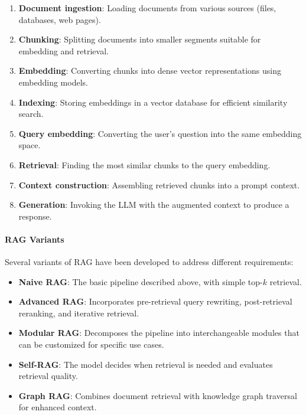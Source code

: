 \documentclass[a4paper,twoside]{sapthesis}
\begin{document}
\begin{enumerate}
    \item \textbf{Document ingestion}: Loading documents from various sources (files, databases, web pages).
    
    \item \textbf{Chunking}: Splitting documents into smaller segments suitable for embedding and retrieval.
    
    \item \textbf{Embedding}: Converting chunks into dense vector representations using embedding models.
    
    \item \textbf{Indexing}: Storing embeddings in a vector database for efficient similarity search.
    
    \item \textbf{Query embedding}: Converting the user's question into the same embedding space.
    
    \item \textbf{Retrieval}: Finding the most similar chunks to the query embedding.
    
    \item \textbf{Context construction}: Assembling retrieved chunks into a prompt context.
    
    \item \textbf{Generation}: Invoking the LLM with the augmented context to produce a response.
\end{enumerate}

\paragraph{RAG Variants}

Several variants of RAG have been developed to address different requirements:

\begin{itemize}
    \item \textbf{Naive RAG}: The basic pipeline described above, with simple top-$k$ retrieval.
    
    \item \textbf{Advanced RAG}: Incorporates pre-retrieval query rewriting, post-retrieval reranking, and iterative retrieval.
    
    \item \textbf{Modular RAG}: Decomposes the pipeline into interchangeable modules that can be customized for specific use cases.
    
    \item \textbf{Self-RAG}: The model decides when retrieval is needed and evaluates retrieval quality.
    
    \item \textbf{Graph RAG}: Combines document retrieval with knowledge graph traversal for enhanced context.
\end{itemize}
\end{document}

